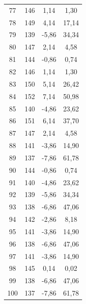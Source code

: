 \documentclass[10pt]{article}
\begin{document}
\begin{xltabular}{\textwidth}{|c|c|c|c|}
77  & 146 & 1,14  & 1,30  \\
78  & 149 & 4,14  & 17,14 \\
79  & 139 & -5,86 & 34,34 \\
80  & 147 & 2,14  & 4,58  \\
81  & 144 & -0,86 & 0,74  \\
82  & 146 & 1,14  & 1,30  \\
83  & 150 & 5,14  & 26,42 \\
84  & 152 & 7,14  & 50,98 \\
85  & 140 & -4,86 & 23,62 \\
86  & 151 & 6,14  & 37,70 \\
87  & 147 & 2,14  & 4,58  \\
88  & 141 & -3,86 & 14,90 \\
89  & 137 & -7,86 & 61,78 \\
90  & 144 & -0,86 & 0,74  \\
91  & 140 & -4,86 & 23,62 \\
92  & 139 & -5,86 & 34,34 \\
93  & 138 & -6,86 & 47,06 \\
94  & 142 & -2,86 & 8,18  \\
95  & 141 & -3,86 & 14,90 \\
96  & 138 & -6,86 & 47,06 \\
97  & 141 & -3,86 & 14,90 \\
98  & 145 & 0,14  & 0,02  \\
99  & 138 & -6,86 & 47,06 \\
100 & 137 & -7,86 & 61,78 \\
\end{xltabular}
\end{document}
